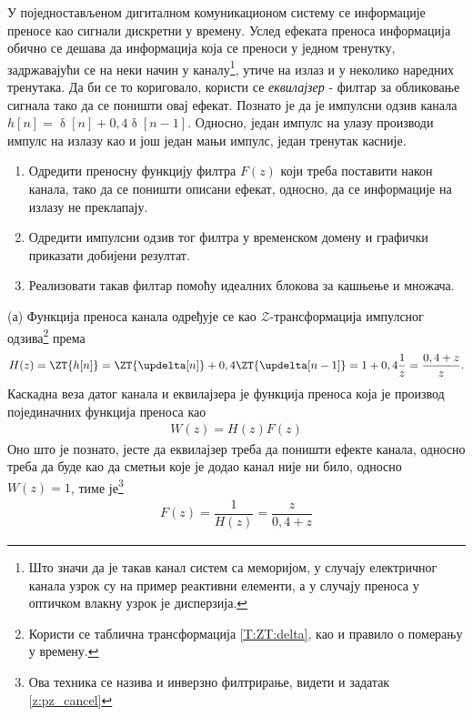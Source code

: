 \PID
У поједностављеном дигиталном комуникационом систему се информације преносе као сигнали дискретни у времену. 
Услед ефеката преноса информација обично се дешава да информација која се 
преноси у једном тренутку, задржавајући се на неки начин у каналу\footnote{Што значи да је такав канал систем са меморијом, у случају 
електричног канала узрок су на пример реактивни елементи, а у случају преноса у оптичком влакну узрок је дисперзија.}, утиче на излаз и у неколико наредних 
тренутака. Да би се то кориговало, користи се \textit{еквилајзер} - филтар за обликовање сигнала тако да се поништи овај ефекат. Познато је да је импулсни
одзив канала $h[n] = \updelta[n] + 0,4 \updelta[n-1]$. Односно, један импулс на улазу производи импулс на излазу као и још један мањи импулс, један 
тренутак касније. 
\begin{enumerate}[label=(\alph*)]
\item Одредити преносну функцију филтра $F(z)$ који треба поставити након канала, тако да се поништи описани ефекат, односно, да се информације на 
излазу не преклапају. 
\item Одредити импулсни одзив тог филтра у временском домену и графички приказати добијени резултат. 
\item Реализовати такав филтар помоћу идеалних блокова за кашњење и множача. 
\end{enumerate}

\RESENJE
(а) Функција преноса канала одређује се као $\mathcal{Z}$-трансформација импулсног одзива\footnote{
    Користи се таблична трансформација \ref{T:ZT:delta}, као и правило о померању у времену. 
} према 
\begin{eqnarray}
    H(z) = \ZT{h[n]} = \ZT{\updelta[n]} + 0,4 \ZT{\updelta[n-1]} 
                     = 1 + 0,4\dfrac{1}{z} = \dfrac{0,4 + z}{z}.
\end{eqnarray}
Каскадна веза датог канала и еквилајзера је функција преноса која је производ појединачних функција преноса као 
\begin{eqnarray}
    W(z) = H(z) F(z)
\end{eqnarray}
Оно што је познато, јесте да еквилајзер треба да поништи ефекте канала, односно треба да буде као да сметњи које је додао канал није ни било, 
односно $W(z) = 1$, тиме је\footnote{Ова техника се назива и инверзно филтрирање, видети и задатак \ref{z:pz_cancel}}
\begin{eqnarray}
    F(z) = \dfrac{1}{H(z)} = \dfrac{z}{0,4 + z}
\end{eqnarray}

